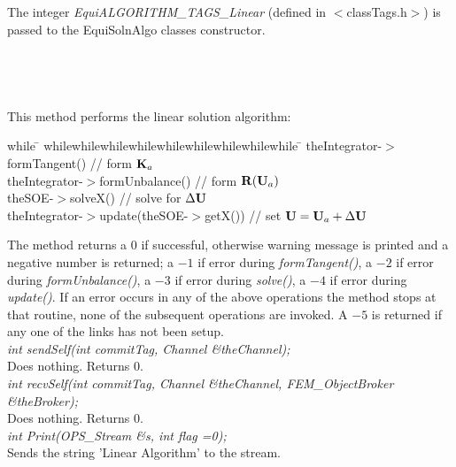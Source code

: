  \\ 
\\ 
The integer {\em EquiALGORITHM\_TAGS\_Linear} (defined in
$<$classTags.h$>$) is passed to the EquiSolnAlgo classes
constructor. \\

 \\
\\ 

  \\
 \\
This method performs the linear solution algorithm:
\begin{tabbing}
while \= \+ whilewhilewhilewhilewhilewhilewhilewhilewhile \= \kill
theIntegrator-$>$formTangent() \+ // form ${\bf K}_{a}$ \- \\
theIntegrator-$>$formUnbalance() // form ${\bf R}({\bf U}_{a})$ \\
theSOE-$>$solveX() // solve for $\Delta {\bf U}$ \\
theIntegrator-$>$update(theSOE-$>$getX()) // set ${\bf U} = {\bf U}_{a} + \Delta {\bf U}$ \-  
\end{tabbing}

The method returns a 0 if successful, otherwise warning message is
printed and a negative number is returned; a $-1$ if error during {\em
formTangent()}, a $-2$ if error during {\em formUnbalance()}, a $-3$
if error during {\em solve()}, a $-4$ if error during {\em
update()}. If an error occurs in any of the above operations the
method stops at that routine, none of the subsequent operations are
invoked. A $-5$ is returned if any one of the links has not been
setup. \\


{\em int sendSelf(int commitTag, Channel \&theChannel);}\\
Does  nothing. Returns 0. \\


{\em int recvSelf(int commitTag, Channel \&theChannel, FEM\_ObjectBroker
\&theBroker);}\\ 
Does nothing. Returns 0. \\

{\em int Print(OPS\_Stream \&s, int flag =0);} \\
Sends the string 'Linear Algorithm' to the stream.